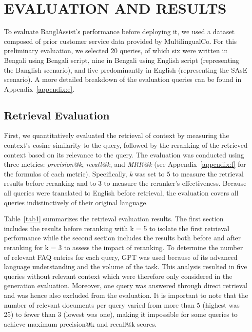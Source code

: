 \documentclass[sigconf]{acmart}
\begin{document}
\section{EVALUATION AND RESULTS}

To evaluate BanglAssist's performance before deploying it, we used a dataset composed of prior customer service data provided by MultilingualCo. For this preliminary evaluation, we selected 20 queries, of which six were written in Bengali using Bengali script, nine in Bengali using English script (representing the Banglish scenario), and five predominantly in English (representing the SAsE scenario). A more detailed breakdown of the evaluation queries can be found in Appendix~\ref{appendix:e}.

\subsection{Retrieval Evaluation}

First, we quantitatively evaluated the retrieval of context by measuring the context's cosine similarity to the query, followed by the reranking of the retrieved context based on its relevance to the query. The evaluation was conducted using three metrics: \textit{precision@k}, \textit{recall@k}, and \textit{MRR@k} (see Appendix~\ref{appendix:f} for the formulas of each metric). Specifically, \textit{k} was set to 5 to measure the retrieval results before reranking and to 3 to measure the reranker's effectiveness. Because all queries were translated to English before retrieval, the evaluation covers all queries indistinctively of their original language.

Table~\ref{tab1} summarizes the retrieval evaluation results. The first section includes the results before reranking with k = 5 to isolate the first retrieval performance while the second section includes the results both before and after reranking for k = 3 to assess the impact of reranking. To determine the number of relevant FAQ entries for each query, GPT was used because of its advanced language understanding and the volume of the task. This analysis resulted in five queries without relevant context which were therefore only considered in the generation evaluation. Moreover, one query was answered through direct retrieval and was hence also excluded from the evaluation. It is important to note that the number of relevant documents per query varied from more than 5 (highest was 25) to fewer than 3 (lowest was one), making it impossible for some queries to achieve maximum precision@k and recall@k scores.
\end{document}
